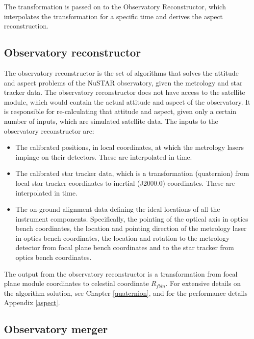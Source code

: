  The transformation is passed on to the Observatory Reconstructor, which interpolates the transformation for a specific time and derives the aspect reconstruction.

\subsection{Observatory reconstructor}
The observatory reconstructor is the set of algorithms that solves the attitude and aspect problems of the NuSTAR observatory, given the metrology and star tracker data. The observatory reconstructor does not have access to the satellite module, which would contain the actual attitude and aspect of the observatory. It is responsible for re-calculating that attitude and aspect, given only a certain number of inputs, which are simulated satellite data.
The inputs to the observatory reconstructor are:
\begin{itemize}
\item The calibrated positions, in local coordinates, at which the metrology lasers impinge on their detectors. These are interpolated in time.
\item The calibrated star tracker data, which is a transformation (quaternion) from local star tracker coordinates to inertial (J2000.0) coordinates. These are interpolated in time. 
\item The on-ground alignment data defining the ideal locations of all the instrument components. Specifically, the pointing of the optical axis in optics bench coordinates, the location and pointing direction of the metrology laser in optics bench coordinates, the location and rotation to the metrology detector from focal plane bench coordinates and to the star tracker from optics bench coordinates.
\end{itemize}
The output from the observatory reconstructor is a transformation from focal plane module coordinates to celestial coordinate $R_{fbin}$.
For extensive details on the algorithm solution, see Chapter \ref{quaternion}, and for the performance details Appendix \ref{aspect}.


\subsection{Observatory merger}
